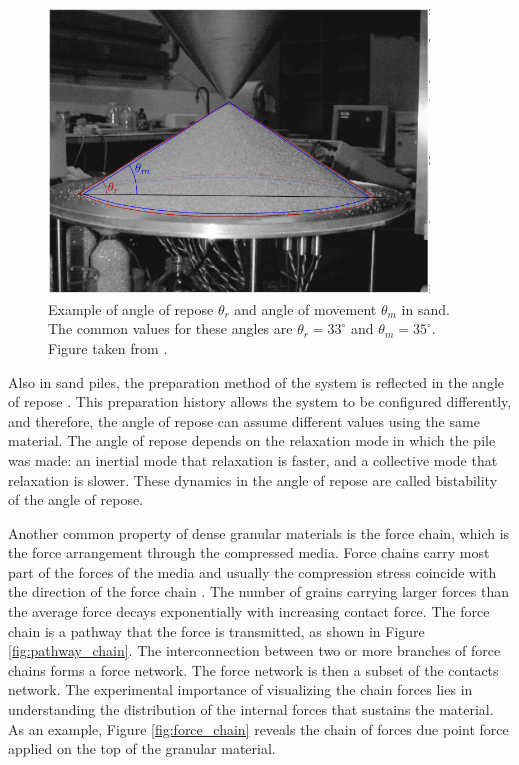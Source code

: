     \begin{figure}
        \centering
        \includegraphics[width=0.9\textwidth]{04-figuras/Sand_Pile_GG_Experiment_Angles.png}
        \caption[Angle of repose and angle of movement.]{Example of angle of repose $\theta _r$ and angle of movement $\theta _m$ in sand. The common values for these angles are $\theta _r = 33^{\circ}$ and $\theta _m = 35^{\circ}$. Figure taken from \cite{Memories_in_Sand}.}
        \label{fig:angulo_repouso}
    \end{figure}

    Also in sand piles, the preparation method of the system is reflected in the angle of repose \cite{Dynamics_at_the_angle_of_repose}. This preparation history allows the system to be configured differently, and therefore, the angle of repose can assume different values using the same material. The angle of repose depends on the relaxation mode in which the pile was made: an inertial mode that relaxation is faster, and a collective mode that relaxation is slower. These dynamics in the angle of repose are called bistability of the angle of repose.

    Another common property of dense granular materials is the force chain, which is the force arrangement through the compressed media. Force chains carry most part of the forces of the media and usually the compression stress coincide with the direction of the force chain \cite{Characterization_of_force_chains_in_granular_material, Granular_and_Complex_Materials}. The number of grains carrying larger forces than the average force decays exponentially with increasing contact force. The force chain is a pathway that the force is transmitted, as shown in Figure \ref{fig:pathway_chain}. The interconnection between two or more branches of force chains forms a force network. The force network is then a subset of the contacts network. The experimental importance of visualizing the chain forces lies in understanding the distribution of the internal forces that sustains the material. As an example, Figure \ref{fig:force_chain} reveals the chain of forces due point force applied on the top of the granular material.

